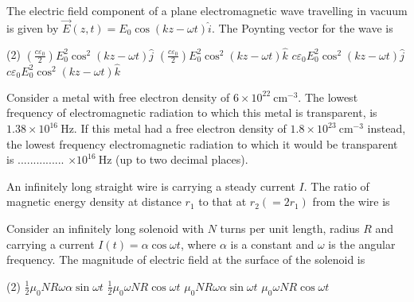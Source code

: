 \begin{enumerate}
\begin{minipage}{\textwidth}
	\item The electric field component of a plane electromagnetic wave travelling in vacuum is given by $\vec{E}(z, t)=E_{0} \cos (k z-\omega t) \hat{i}$. The Poynting vector for the wave is
\end{minipage}
\begin{tasks}(2)
	\task[\textbf{A.}] $\left(\frac{c \varepsilon_{0}}{2}\right) E_{0}^{2} \cos ^{2}(k z-\omega t) \hat{j}$
	\task[\textbf{B.}]$\left(\frac{c \varepsilon_{0}}{2}\right) E_{0}^{2} \cos ^{2}(k z-\omega t) \hat{k}$
	\task[\textbf{C.}] $c \varepsilon_{0} E_{0}^{2} \cos ^{2}(k z-\omega t) \hat{j}$
	\task[\textbf{D.}]$c \varepsilon_{0} E_{0}^{2} \cos ^{2}(k z-\omega t) \hat{k}$
\end{tasks}
\begin{minipage}{\textwidth}
	\item Consider a metal with free electron density of $6 \times 10^{22} \mathrm{~cm}^{-3}$. The lowest frequency of electromagnetic radiation to which this metal is transparent, is $1.38 \times 10^{16} \mathrm{~Hz}$. If this metal had a free electron density of $1.8 \times 10^{23} \mathrm{~cm}^{-3}$ instead, the lowest frequency electromagnetic radiation to which it would be transparent is ............... $\times 10^{16} \mathrm{~Hz}$ (up to two decimal places).
\end{minipage}
\begin{minipage}{\textwidth}
	\item An infinitely long straight wire is carrying a steady current $I$. The ratio of magnetic energy density at distance $r_{1}$ to that at $r_{2}\left(=2 r_{1}\right)$ from the wire is
\end{minipage}
\begin{minipage}{\textwidth}
	\item Consider an infinitely long solenoid with $N$ turns per unit length, radius $R$ and carrying a current $I(t)=\alpha \cos \omega t$, where $\alpha$ is a constant and $\omega$ is the angular frequency. The magnitude of electric field at the surface of the solenoid is
\end{minipage}
\begin{tasks}(2)
	\task[\textbf{A.}] $\frac{1}{2} \mu_{0} N R \omega \alpha \sin \omega t$
	\task[\textbf{B.}]$\frac{1}{2} \mu_{0} \omega N R \cos \omega t$
	\task[\textbf{C.}]$\mu_{0} N R \omega \alpha \sin \omega t$
	\task[\textbf{D.}]$\mu_{0} \omega N R \cos \omega t$

\end{tasks}
\end{enumerate}
